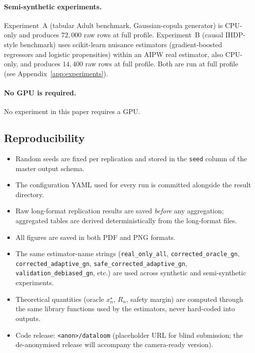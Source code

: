 \paragraph{Semi-synthetic experiments.} Experiment~A (tabular Adult benchmark, Gaussian-copula generator) is CPU-only and produces $72{,}000$ raw rows at full profile. Experiment~B (causal IHDP-style benchmark) uses scikit-learn nuisance estimators (gradient-boosted regressors and logistic propensities) within an AIPW real estimator, also CPU-only, and produces $14{,}400$ raw rows at full profile. Both are run at full profile (see Appendix~\ref{app:experiments}).

\paragraph{No GPU is required.} No experiment in this paper requires a GPU.

\subsection{Reproducibility}\label{ssec:impl-repro}

\begin{itemize}[leftmargin=*]
\item Random seeds are fixed per replication and stored in the \texttt{seed} column of the master output schema.
\item The configuration YAML used for every run is committed alongside the result directory.
\item Raw long-format replication results are saved \emph{before} any aggregation; aggregated tables are derived deterministically from the long-format files.
\item All figures are saved in both PDF and PNG formats.
\item The same estimator-name strings (\texttt{real\_only\_all}, \texttt{corrected\_oracle\_gn}, \texttt{corrected\_adaptive\_gn}, \texttt{safe\_corrected\_adaptive\_gn}, \texttt{validation\_debiased\_gn}, etc.) are used across synthetic and semi-synthetic experiments.
\item Theoretical quantities (oracle $x_n^\star$, $R_n$, safety margin) are computed through the same library functions used by the estimators, never hard-coded into outputs.
\item Code release: \texttt{<anon>/dataloom} (placeholder URL for blind submission; the de-anonymised release will accompany the camera-ready version).
\end{itemize}

